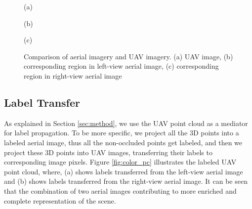 \begin{figure}[htb]
\begin{minipage}[b]{0.32\linewidth}
  \centering
  \centerline{}
  \centerline{(a)}
\end{minipage}
\begin{minipage}[b]{0.32\linewidth}
  \centering
  \centerline{}
  \centerline{(b)}
\end{minipage}
\hfill
\begin{minipage}[b]{0.32\linewidth}
  \centering
  \centerline{}
  \centerline{(c)}
\end{minipage}
\hfill
\caption{Comparison of aerial imagery and UAV imagery. (a) UAV image, (b) corresponding region in left-view aerial image, (c) corresponding region in right-view aerial image}
\label{fig:3k_uav}
\end{figure}



\subsection{Label Transfer}
As explained in Section \ref{sec:method}, we use the UAV point cloud as a mediator for label propagation. To be more specific, we project all the 3D points into a labeled aerial image, thus all the non-occluded points get labeled, and then we project these 3D points into UAV images, transferring their labels to corresponding image pixels. Figure \ref{fig:color_pc} illustrates the labeled UAV point cloud, where, (a) shows labels transferred from the left-view aerial image and (b) shows labels transferred from the right-view aerial image. It can be seen that the combination of two aerial images contributing to more enriched and complete representation of the scene.     

